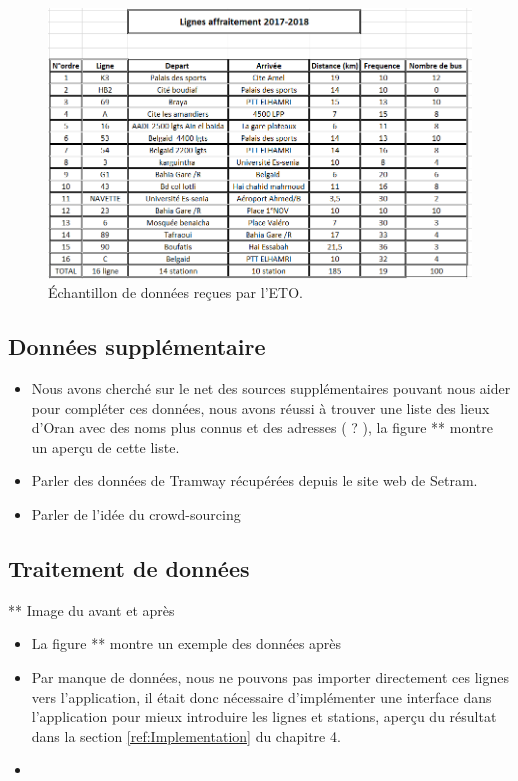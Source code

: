 \begin{figure}
	\center
	\includegraphics[scale=0.7]{img/LignesETO.png}
	\caption{Échantillon de données reçues par l'ETO.}
\end{figure}

\subsection{Données supplémentaire}
	\begin{itemize}
		\item Nous avons cherché sur le net des sources supplémentaires pouvant nous aider pour compléter ces données, nous avons réussi à trouver une liste des lieux d'Oran avec des noms plus connus et des adresses ( ? ), la figure ** montre un aperçu de cette liste.
		\item Parler des données de Tramway récupérées depuis le site web de Setram.
		\item Parler de l'idée du crowd-sourcing
	\end{itemize}

\subsection{Traitement de données}
** Image du avant et après

\begin{itemize}
	\item La figure ** montre un exemple des données après 
	\item Par manque de données, nous ne pouvons pas importer directement ces lignes vers l'application, il était donc nécessaire d'implémenter une interface dans l'application pour mieux introduire les lignes et stations, aperçu du résultat dans la section \ref{ref:Implementation} du chapitre 4.
	
	\item 
\end{itemize}

